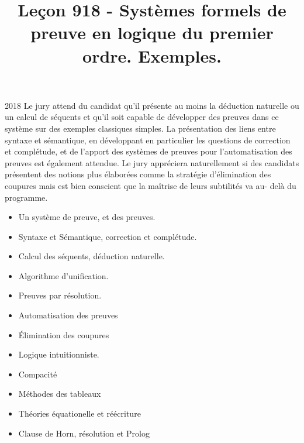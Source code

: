 \documentclass{agregfiche}
\title{Leçon 918 - Systèmes formels de preuve en logique du premier ordre. Exemples.}
\begin{document}
\maketitle

\secrapports
\begin{rapport}{2018}
	Le jury attend du candidat qu’il présente au moins la déduction naturelle ou un calcul de séquents
	et qu’il soit capable de développer des preuves dans ce système sur des exemples classiques simples.
	La présentation des liens entre syntaxe et sémantique, en développant en particulier les questions de
	correction et complétude, et de l’apport des systèmes de preuves pour l’automatisation des preuves est
	également attendue.
	Le jury appréciera naturellement si des candidats présentent des notions plus élaborées comme la
	stratégie d’élimination des coupures mais est bien conscient que la maîtrise de leurs subtilités va au-
	delà du programme.
\end{rapport}

\secindispensables

\begin{itemize}
	\item Un système de preuve, et des preuves.
	\item Syntaxe et Sémantique, correction et complétude.
\end{itemize}

\secasavoir

\begin{itemize}
	\item Calcul des séquents, déduction naturelle.
	\item Algorithme d'unification.
	\item Preuves par résolution.
	\item Automatisation des preuves
\end{itemize}

\secidees

\begin{itemize}
	\item Élimination des coupures
	\item Logique intuitionniste.
	\item Compacité
	\item Méthodes des tableaux
	\item Théories équationelle et réécriture
	\item Clause de Horn, résolution et Prolog
\end{itemize}

\secpieges
\end{document}
